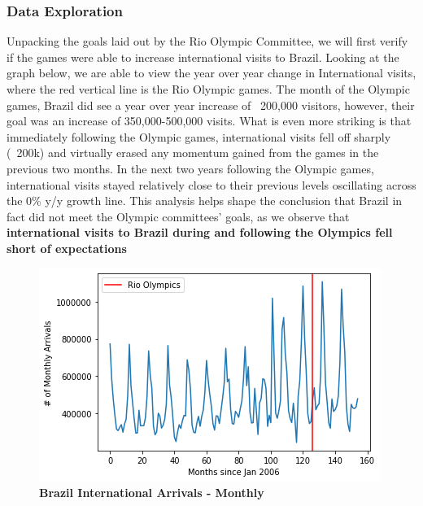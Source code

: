 \documentclass[11pt, twocolumn]{article}
\begin{document}
\subsubsection{Data Exploration}

    Unpacking the goals laid out by the Rio Olympic Committee, we will first verify if the games were able to increase international visits to Brazil. Looking at the graph below, we are able to view the year over year change in International visits, where the red vertical line is the Rio Olympic games. The month of the Olympic games, Brazil did see a year over year increase of ~200,000 visitors, however, their goal was an increase of 350,000-500,000 visits. What is even more striking is that immediately following the Olympic games, international visits fell off sharply (~200k) and virtually erased any momentum gained from the games in the previous two months. In the next two years following the Olympic games, international visits stayed relatively close to their previous levels oscillating across the 0\% y/y growth line. This analysis helps shape the conclusion that Brazil in fact did not meet the Olympic committees’ goals, as we observe that \textbf{international visits to Brazil during and following the Olympics fell short of expectations}
    
    \begin{figure}[H]
        \centering
            \includegraphics[scale=0.6]{Brazil_Arrivals.png}
        \caption{\textbf{Brazil International Arrivals - Monthly}}
        \label{fig:Brazil_Arrivals}
    \end{figure}
        
\end{document}
